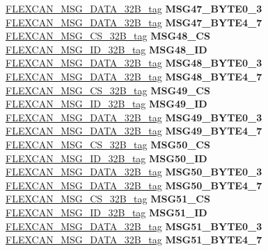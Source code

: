 \begin{DoxyCompactItemize}
\begin{tabbing}
\>\>\mbox{\hyperlink{unionFLEXCAN__MSG__DATA__32B__tag}{FLEXCAN\_MSG\_DATA\_32B\_tag}} {\bfseries MSG47\_BYTE0\_3}\\
\>\>\mbox{\hyperlink{unionFLEXCAN__MSG__DATA__32B__tag}{FLEXCAN\_MSG\_DATA\_32B\_tag}} {\bfseries MSG47\_BYTE4\_7}\\
\>\>\mbox{\hyperlink{unionFLEXCAN__MSG__CS__32B__tag}{FLEXCAN\_MSG\_CS\_32B\_tag}} {\bfseries MSG48\_CS}\\
\>\>\mbox{\hyperlink{unionFLEXCAN__MSG__ID__32B__tag}{FLEXCAN\_MSG\_ID\_32B\_tag}} {\bfseries MSG48\_ID}\\
\>\>\mbox{\hyperlink{unionFLEXCAN__MSG__DATA__32B__tag}{FLEXCAN\_MSG\_DATA\_32B\_tag}} {\bfseries MSG48\_BYTE0\_3}\\
\>\>\mbox{\hyperlink{unionFLEXCAN__MSG__DATA__32B__tag}{FLEXCAN\_MSG\_DATA\_32B\_tag}} {\bfseries MSG48\_BYTE4\_7}\\
\>\>\mbox{\hyperlink{unionFLEXCAN__MSG__CS__32B__tag}{FLEXCAN\_MSG\_CS\_32B\_tag}} {\bfseries MSG49\_CS}\\
\>\>\mbox{\hyperlink{unionFLEXCAN__MSG__ID__32B__tag}{FLEXCAN\_MSG\_ID\_32B\_tag}} {\bfseries MSG49\_ID}\\
\>\>\mbox{\hyperlink{unionFLEXCAN__MSG__DATA__32B__tag}{FLEXCAN\_MSG\_DATA\_32B\_tag}} {\bfseries MSG49\_BYTE0\_3}\\
\>\>\mbox{\hyperlink{unionFLEXCAN__MSG__DATA__32B__tag}{FLEXCAN\_MSG\_DATA\_32B\_tag}} {\bfseries MSG49\_BYTE4\_7}\\
\>\>\mbox{\hyperlink{unionFLEXCAN__MSG__CS__32B__tag}{FLEXCAN\_MSG\_CS\_32B\_tag}} {\bfseries MSG50\_CS}\\
\>\>\mbox{\hyperlink{unionFLEXCAN__MSG__ID__32B__tag}{FLEXCAN\_MSG\_ID\_32B\_tag}} {\bfseries MSG50\_ID}\\
\>\>\mbox{\hyperlink{unionFLEXCAN__MSG__DATA__32B__tag}{FLEXCAN\_MSG\_DATA\_32B\_tag}} {\bfseries MSG50\_BYTE0\_3}\\
\>\>\mbox{\hyperlink{unionFLEXCAN__MSG__DATA__32B__tag}{FLEXCAN\_MSG\_DATA\_32B\_tag}} {\bfseries MSG50\_BYTE4\_7}\\
\>\>\mbox{\hyperlink{unionFLEXCAN__MSG__CS__32B__tag}{FLEXCAN\_MSG\_CS\_32B\_tag}} {\bfseries MSG51\_CS}\\
\>\>\mbox{\hyperlink{unionFLEXCAN__MSG__ID__32B__tag}{FLEXCAN\_MSG\_ID\_32B\_tag}} {\bfseries MSG51\_ID}\\
\>\>\mbox{\hyperlink{unionFLEXCAN__MSG__DATA__32B__tag}{FLEXCAN\_MSG\_DATA\_32B\_tag}} {\bfseries MSG51\_BYTE0\_3}\\
\>\>\mbox{\hyperlink{unionFLEXCAN__MSG__DATA__32B__tag}{FLEXCAN\_MSG\_DATA\_32B\_tag}} {\bfseries MSG51\_BYTE4\_7}\\

\end{tabbing}
\end{DoxyCompactItemize}
